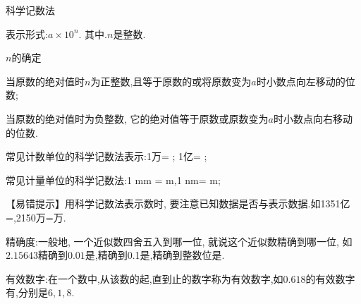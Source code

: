 \documentclass[cn,blue,12pt]{elegantbook}
\begin{document}
\begin{zsyd}
\item 科学记数法
    \begin{zsyd}
    \item 表示形式:\(a \times 10^n\). 其中.\(n\)是整数.
    \item \(n\)的确定
        \begin{zsyd}
        \item 当原数的绝对值时\(n\)为正整数,且等于原数的或将原数变为\(a\)时小数点向左移动的位数;
        \item 当原数的绝对值时为负整数, 它的绝对值等于原数或原数变为\(a\)时小数点向右移动的位数.
        \end{zsyd}
    \item 常见计数单位的科学记数法表示:1万= ; 1亿= ;
    \item 常见计量单位的科学记数法:1 mm =  m,1 nm=  m;
    \item 【易错提示】用科学记数法表示数时, 要注意已知数据是否与表示数据.如1351亿=,2150万=万.
    \end{zsyd}
\item 精确度:一般地, 一个近似数四舍五入到哪一位, 就说这个近似数精确到哪一位, 如\(2.15643\)精确到\(0.01\)是,精确到0.1是,精确到整数位是.
\item 有效数字:在一个数中,从该数的起,直到止的数字称为有效数字,如\(0.618\)的有效数字有,分别是\(6,1,8\).
\end{zsyd}
\end{document}
